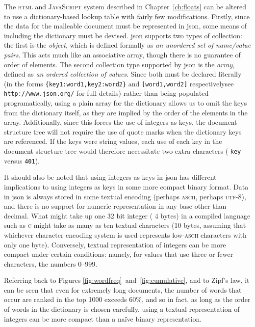 The \textsc{html} and \textsc{JavaScript} system described in Chapter~\ref{ch:floats} can be altered to use a dictionary-based lookup table with fairly few modifications. Firstly, since the data for the malleable document must be represented in \gls{json}, some means of including the dictionary must be devised. \gls{json} supports two types of collection: the first is the \emph{object}, which is defined formally as \emph{an \mbox{unordered} set of name/value pairs}. This acts much like an associative array, though there is no guarantee of order of elements.  The second collection type supported by \gls{json} is the \emph{array}, defined as \emph{an ordered collection of values}. Since both must be declared literally (in the forms \texttt{\{\textquotedbl key1\textquotedbl:\textquotedbl word1\textquotedbl,\textquotedbl key2\textquotedbl:\textquotedbl word2\textquotedbl\}} and \texttt{[\textquotedbl word1\textquotedbl,\textquotedbl word2\textquotedbl]} respectively\ed see \texttt{http://www.json.org/} for full details) rather than being populated programatically, using a plain array for the dictionary allows us to omit the keys from the dictionary itself, as they are implied by the order of the elements in the array. Additionally, since this forces the use of integers as keys, the document structure tree will not require the use of quote marks when the dictionary keys are referenced. If the keys were string values, each use of each key in the document structure tree would therefore necessitate two extra characters (\eg{} \texttt{\textquotedbl key\textquotedbl} versus \texttt{401}).

It should also be noted that using integers as keys in \gls{json} has different implications to using integers as keys in some more compact binary format. Data in \gls{json} is always stored in some textual encoding (perhaps \textsc{ascii}, perhaps \textsc{utf-8}), and there is no support for numeric representation in any base other than decimal. What might take up one 32 bit integer (\ie{} 4 bytes) in a compiled language such as \textsc{c} might take as many as ten textual characters (10 bytes, assuming that whichever character encoding system is used represents low-\textsc{ascii} characters with only one byte). Conversely, textual representation of integers can be more compact under certain conditions: namely, for values that use three or fewer characters, \ie{} the numbers 0--999.

Referring back to Figures \ref{fig:wordfreq}~and~\ref{fig:cumulative}, and to Zipf's law, it can be seen that even for extremely long documents, the number of words that occur are ranked in the top 1000 exceeds 60\%, and so in fact, as long as the order of words in the dictionary is chosen carefully, using a textual representation of integers can be more compact than a na\"ive binary representation.

